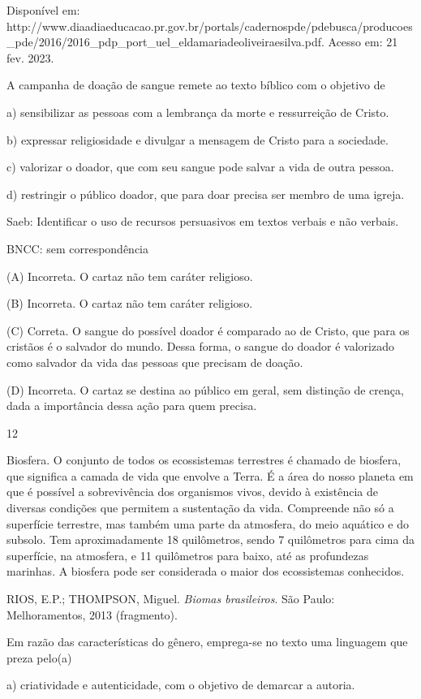 Disponível em:
http://www.diaadiaeducacao.pr.gov.br/portals/cadernospde/pdebusca/producoes\_pde/2016/2016\_pdp\_port\_uel\_eldamariadeoliveiraesilva.pdf.
Acesso em: 21 fev. 2023.

A campanha de doação de sangue remete ao texto bíblico com o objetivo de

a) sensibilizar as pessoas com a lembrança da morte e ressurreição de
Cristo.

b) expressar religiosidade e divulgar a mensagem de Cristo para a
sociedade.

c) valorizar o doador, que com seu sangue pode salvar a vida de outra
pessoa.

d) restringir o público doador, que para doar precisa ser membro de uma
igreja.

Saeb: Identificar o uso de recursos persuasivos em textos verbais e não
verbais.

BNCC: sem correspondência

(A) Incorreta. O cartaz não tem caráter religioso.

(B) Incorreta. O cartaz não tem caráter religioso.

(C) Correta. O sangue do possível doador é comparado ao de Cristo, que
para os cristãos é o salvador do mundo. Dessa forma, o sangue do doador
é valorizado como salvador da vida das pessoas que precisam de doação.

(D) Incorreta. O cartaz se destina ao público em geral, sem distinção de
crença, dada a importância dessa ação para quem precisa.

\num{12}

Biosfera. O conjunto de todos os ecossistemas terrestres é chamado de
biosfera, que significa a camada de vida que envolve a Terra. É a área
do nosso planeta em que é possível a sobrevivência dos organismos vivos,
devido à existência de diversas condições que permitem a sustentação da
vida. Compreende não só a superfície terrestre, mas também uma parte da
atmosfera, do meio aquático e do subsolo. Tem aproximadamente 18
quilômetros, sendo 7 quilômetros para cima da superfície, na atmosfera,
e 11 quilômetros para baixo, até as profundezas marinhas. A biosfera
pode ser considerada o maior dos ecossistemas conhecidos.

RIOS, E.P.; THOMPSON, Miguel. \emph{Biomas brasileiros}. São Paulo:
Melhoramentos, 2013 (fragmento).

Em razão das características do gênero, emprega-se no texto uma
linguagem que preza pelo(a)

a) criatividade e autenticidade, com o objetivo de demarcar a autoria.

